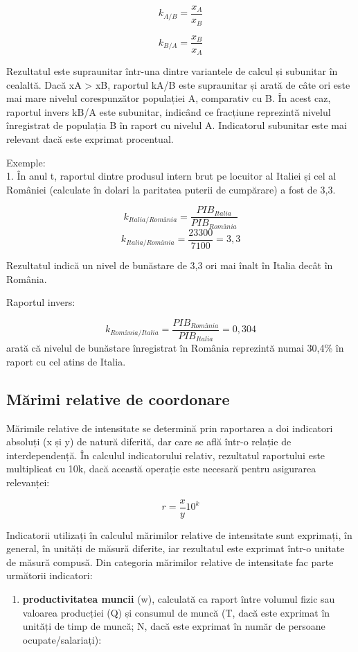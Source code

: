 \documentclass[
  11pt,
  b5paper,
  nottoc]{book}
\providecommand{\tightlist}{%
  \setlength{\itemsep}{0pt}\setlength{\parskip}{0pt}}\usepackage{longtable,booktabs,array}
\begin{document}
\[k_{{A}/{B}} = \frac{x_{A}}{x_{B}}\]

\[k_{{B}/{A}} = \frac{x_{B}}{x_{A}}\]

Rezultatul este supraunitar într-una dintre variantele de calcul și
subunitar în cealaltă. Dacă xA \textgreater{} xB, raportul kA/B este
supraunitar și arată de câte ori este mai mare nivelul corespunzător
populației A, comparativ cu B. În acest caz, raportul invers kB/A este
subunitar, indicând ce fracțiune reprezintă nivelul înregistrat de
populația B în raport cu nivelul A. Indicatorul subunitar este mai
relevant dacă este exprimat procentual.

Exemple:\\
1. În anul t, raportul dintre produsul intern brut pe locuitor al
Italiei și cel al României (calculate în dolari la paritatea puterii de
cumpărare) a fost de 3,3.

\[k_{{Italia}/{România}} = \frac{PIB_{Italia}}{PIB_{România}}\]
\[k_{{Italia}/{România}} = \frac{23300}{7100} = 3,3\]

Rezultatul indică un nivel de bunăstare de 3,3 ori mai înalt în Italia
decât în România.

Raportul invers:

\[k_{{România}/{Italia}} = \frac{PIB_{România}}{PIB_{Italia}} = 0,304\]
arată că nivelul de bunăstare înregistrat în România reprezintă numai
30,4\% în raport cu cel atins de Italia.

\hypertarget{mux103rimi-relative-de-coordonare}{%
\subsection{Mărimi relative de
coordonare}\label{mux103rimi-relative-de-coordonare}}

Mărimile relative de intensitate se determină prin raportarea a doi
indicatori absoluți (x și y) de natură diferită, dar care se află într-o
relație de interdependență. În calculul indicatorului relativ,
rezultatul raportului este multiplicat cu 10k, dacă această operație
este necesară pentru asigurarea relevanței:

\[r = \frac{x}{y}10^{k}\]

Indicatorii utilizați în calculul mărimilor relative de intensitate sunt
exprimați, în general, în unități de măsură diferite, iar rezultatul
este exprimat într-o unitate de măsură compusă. Din categoria mărimilor
relative de intensitate fac parte următorii indicatori:

\begin{enumerate}
\def\labelenumi{\alph{enumi})}
\tightlist
\item
  \textbf{productivitatea muncii} (w), calculată ca raport între volumul
  fizic sau valoarea producției (Q) și consumul de muncă (T, dacă este
  exprimat în unități de timp de muncă; N, dacă este exprimat în număr
  de persoane ocupate/salariați):
\end{enumerate}
\end{document}
